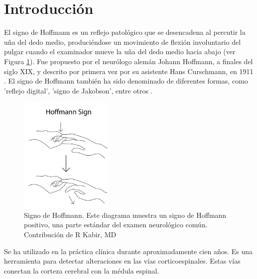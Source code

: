 \section{Introducción}
El signo de Hoffmann es un reflejo patológico que se desencadena al percutir la uña del dedo medio, produciéndose un movimiento de flexión involuntario del pulgar cuando el examinador mueve la uña del dedo medio hacia abajo (ver Figura \ref{fig:Hoffmann_sign}). Fue propuesto por el neurólogo alemán Johann Hoffmann, a finales del siglo XIX, y descrito por primera vez por su asistente Hans Curschmann, en 1911 \cite{BENDHEIM}. El signo de Hoffmann también ha sido denominado de diferentes formas, como 'reflejo digital', 'signo de Jakobson', entre otros \cite{glaser2001cervical}.

\begin{figure}[h!]
	\includegraphics[width=0.4\textwidth]{figures/Kabir_Hoffmann__Sign.jpg}
	\caption{Signo de Hoffmann. Este diagrama muestra un signo de Hoffmann positivo, una parte estándar del examen neurológico común. Contribución de R Kabir, MD\cite{whitney}}
	\label{fig:Hoffmann_sign}
\end{figure}

Se ha utilizado en la práctica clínica durante aproximadamente cien años. Es una herramienta para detectar alteraciones en las vías corticoespinales. Estas vías conectan la corteza cerebral con la médula espinal.\cite{BENDHEIM} \par


